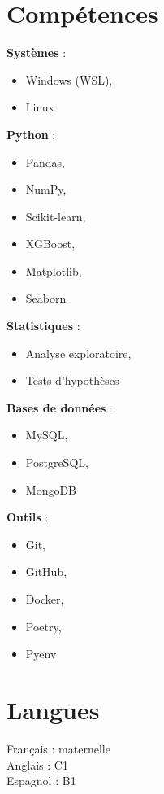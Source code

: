 \documentclass[a4paper,12pt]{article}
\begin{document}
\begin{paracol}{2}
\begin{leftcolumn}
\begin{minipage}[t][\dimexpr\textheight - 9em\relax][t]{\dimexpr\linewidth}
{    \section*{Compétences} 
      \textbf{Systèmes} :
      \begin{itemize}[leftmargin=1em, nosep]
      \item Windows (WSL), 
      \item Linux
      \end{itemize}
      \vspace{0.5em}
      \textbf{Python} :
      \begin{itemize}[leftmargin=1em, nosep]
      \item Pandas, 
      \item NumPy,
      \item Scikit-learn,
      \item XGBoost,
      \item Matplotlib,
      \item Seaborn
      \end{itemize}
      \vspace{0.5em}
      \textbf{Statistiques} :
      \begin{itemize}[leftmargin=1em, nosep]
      \item Analyse exploratoire,
      \item Tests d’hypothèses
      \end{itemize}
      \vspace{0.5em}
      \textbf{Bases de données} :
      \begin{itemize}[leftmargin=1em, nosep]
      \item MySQL,
      \item PostgreSQL,
      \item MongoDB
      \end{itemize}
      \vspace{0.5em}
      \textbf{Outils} :
      \begin{itemize}[leftmargin=1em, nosep]
      \item Git,
      \item GitHub,
      \item Docker,
      \item Poetry,
      \item Pyenv
      \end{itemize}    

    \vspace{1em}
    \section*{Langues}
    Français : maternelle\\
    Anglais : C1\\
    Espagnol : B1

}
\end{minipage}
\end{leftcolumn}
\end{paracol}
\end{document}
